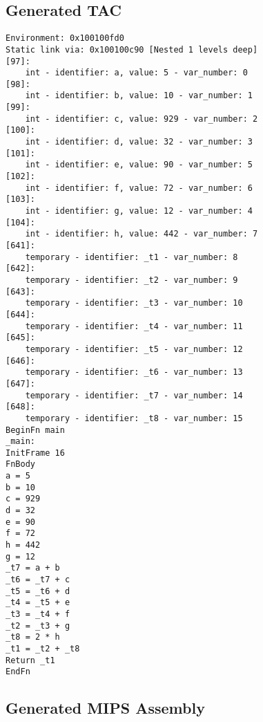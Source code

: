\subsection{Generated TAC}
\begin{verbatim}
Environment: 0x100100fd0
Static link via: 0x100100c90 [Nested 1 levels deep]
[97]:
	int - identifier: a, value: 5 - var_number: 0
[98]:
	int - identifier: b, value: 10 - var_number: 1
[99]:
	int - identifier: c, value: 929 - var_number: 2
[100]:
	int - identifier: d, value: 32 - var_number: 3
[101]:
	int - identifier: e, value: 90 - var_number: 5
[102]:
	int - identifier: f, value: 72 - var_number: 6
[103]:
	int - identifier: g, value: 12 - var_number: 4
[104]:
	int - identifier: h, value: 442 - var_number: 7
[641]:
	temporary - identifier: _t1 - var_number: 8
[642]:
	temporary - identifier: _t2 - var_number: 9
[643]:
	temporary - identifier: _t3 - var_number: 10
[644]:
	temporary - identifier: _t4 - var_number: 11
[645]:
	temporary - identifier: _t5 - var_number: 12
[646]:
	temporary - identifier: _t6 - var_number: 13
[647]:
	temporary - identifier: _t7 - var_number: 14
[648]:
	temporary - identifier: _t8 - var_number: 15
BeginFn main
_main:
InitFrame 16
FnBody
a = 5
b = 10
c = 929
d = 32
e = 90
f = 72
h = 442
g = 12
_t7 = a + b
_t6 = _t7 + c
_t5 = _t6 + d
_t4 = _t5 + e
_t3 = _t4 + f
_t2 = _t3 + g
_t8 = 2 * h
_t1 = _t2 + _t8
Return _t1
EndFn
\end{verbatim}\subsection{Generated MIPS Assembly}

